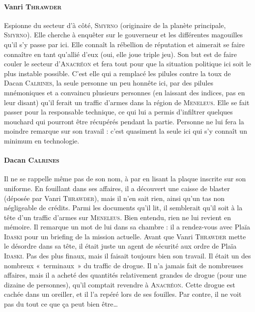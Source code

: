 \documentclass{article}
\begin{document}
{\paragraph{Vanri \textsc{Thrawder}}
{
Espionne du secteur d’à côté, \textsc{Smyrno} (originaire de la planète principale, \textsc{Smyrno}).
Elle cherche à enquêter sur le gouverneur et les différentes magouilles qu’il s’y passe par ici.
Elle connaît la rébellion de réputation et aimerait se faire connaître en tant qu’allié d’eux (oui, elle joue triple jeu).
Son but est de faire couler le secteur d’\textsc{Anacréon} et fera tout pour que la situation politique ici soit le plus instable possible.
C’est elle qui a remplacé les pilules contre la toux de Dacan \textsc{Calrines}, la seule personne un peu honnête ici, par des pilules mnémoniques et a convaincu plusieurs personnes (en laissant des indices, pas en leur disant) qu’il ferait un traffic d’armes dans la région de \textsc{Meneleus}.
Elle se fait passer pour la responsable technique, ce qui lui a permis d’infiltrer quelques mouchard qui pourront être récupérés pendant la partie.
Personne ne lui fera la moindre remarque sur son travail : c’est quasiment la seule ici qui s’y connaît un minimum en technologie.
}

\paragraph{Dacan \textsc{Calrines}}
{
Il ne se rappelle même pas de son nom, à par en lisant la plaque inscrite sur son uniforme.
En fouillant dans ses affaires, il a découvert une caisse de blaster (déposée par Vanri \textsc{Thrawder}), mais il n’en sait rien, ainsi qu’un tas non négligeable de crédits.
Parmi les documents qu’il lit, il semblerait qu’il soit à la tête d’un traffic d’armes sur \textsc{Meneleus}.
Bien entendu, rien ne lui revient en mémoire.
Il remarque un mot de lui dans sa chambre : il a rendez-vous avec Plaïa \textsc{Idaski} pour un briefing de la mission actuelle.
Avant que Vanri \textsc{Thrawder} mette le désordre dans sa tête, il était juste un agent de sécurité aux ordre de Plaïa \textsc{Idaski}.
Pas des plus finaux, mais il faisait toujours bien son travail.
Il était un des nombreux «~terminaux~» du traffic de drogue.
Il n’a jamais fait de nombreuses affaires, mais il a acheté des quantités relativement grandes de drogue (pour une dizaine de personnes), qu’il comptait revendre à \textsc{Anacréon}.
Cette drogue est cachée dans un oreiller, et il l’a repéré lors de ses fouilles.
Par contre, il ne voit pas du tout ce que ça peut bien être\ldots
}

\newpage
}
\end{document}
